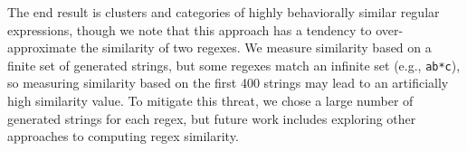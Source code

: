 The end result is clusters and categories of highly behaviorally similar regular expressions, though we note that this approach has a tendency to over-approximate the similarity of two regexes. We measure similarity based on a finite set of generated strings, but some regexes  match an infinite set (e.g., \verb!ab*c!), so measuring similarity based on the first 400 strings may lead to an artificially high similarity value. To mitigate this threat, we chose a large number of generated strings for each regex, but future work includes exploring other approaches to computing regex similarity.


